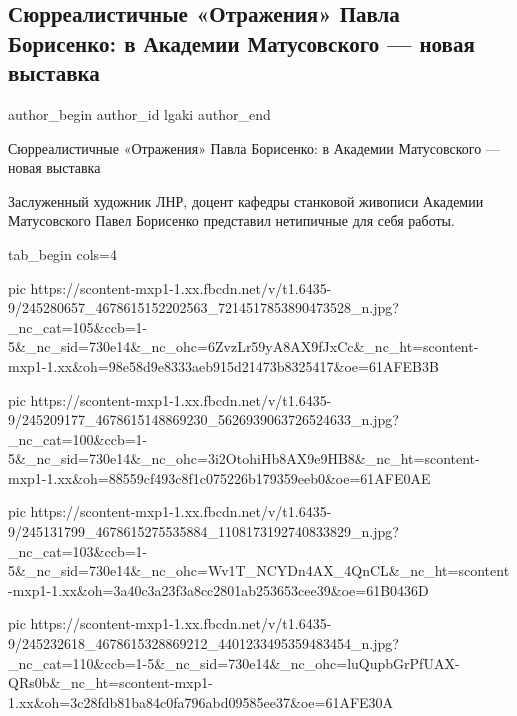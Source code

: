  
 
 
 
 
 
\subsection{Сюрреалистичные «Отражения» Павла Борисенко: в Академии Матусовского — новая выставка}
\label{sec:11_10_2021.fb.lgaki.1.lgaki_vystavka_borisenko}
 
\ifcmt
 author_begin
   author_id lgaki
 author_end
\fi

Сюрреалистичные «Отражения» Павла Борисенко: в Академии Матусовского — новая
выставка

Заслуженный художник ЛНР, доцент кафедры станковой живописи Академии
Матусовского Павел Борисенко представил нетипичные для себя работы.

\ifcmt
  tab_begin cols=4

     pic https://scontent-mxp1-1.xx.fbcdn.net/v/t1.6435-9/245280657_4678615152202563_7214517853890473528_n.jpg?_nc_cat=105&ccb=1-5&_nc_sid=730e14&_nc_ohc=6ZvzLr59yA8AX9fJxCc&_nc_ht=scontent-mxp1-1.xx&oh=98e58d9e8333aeb915d21473b8325417&oe=61AFEB3B

     pic https://scontent-mxp1-1.xx.fbcdn.net/v/t1.6435-9/245209177_4678615148869230_5626939063726524633_n.jpg?_nc_cat=100&ccb=1-5&_nc_sid=730e14&_nc_ohc=3i2OtohiHb8AX9e9HB8&_nc_ht=scontent-mxp1-1.xx&oh=88559cf493c8f1c075226b179359eeb0&oe=61AFE0AE

     pic https://scontent-mxp1-1.xx.fbcdn.net/v/t1.6435-9/245131799_4678615275535884_1108173192740833829_n.jpg?_nc_cat=103&ccb=1-5&_nc_sid=730e14&_nc_ohc=Wv1T_NCYDn4AX_4QnCL&_nc_ht=scontent-mxp1-1.xx&oh=3a40c3a23f3a8cc2801ab253653cee39&oe=61B0436D

     pic https://scontent-mxp1-1.xx.fbcdn.net/v/t1.6435-9/245232618_4678615328869212_4401233495359483454_n.jpg?_nc_cat=110&ccb=1-5&_nc_sid=730e14&_nc_ohc=luQupbGrPfUAX-QRs0b&_nc_ht=scontent-mxp1-1.xx&oh=3c28fdb81ba84c0fa796abd09585ee37&oe=61AFE30A

